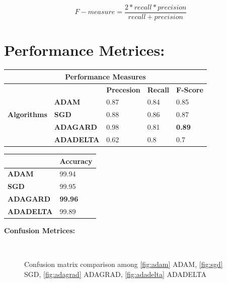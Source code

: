 \documentclass{report}
\begin{document}
\[F-measure = \frac{2 * recall * precision}{recall + precision}\]



\section{Performance Metrices: }
\begin{table}[htbp]
\begin{tabular}{|l|l|l|l|l|}
\hline
\multicolumn{5}{|c|}{\textbf{Performance Measures}} \\ \hline
\multirow{5}{*}{\textbf{Algorithms}} & \textbf{} & \textbf{Precesion} & \textbf{Recall} & \textbf{F-Score} \\ \cline{2-5} 
 & \textbf{ADAM} & 0.87 & 0.84 & 0.85 \\ \cline{2-5} 
 & \textbf{SGD} & 0.88 & 0.86 & 0.87 \\ \cline{2-5} 
 & \textbf{ADAGARD} & 0.98 & 0.81 & \textbf{0.89} \\ \cline{2-5} 
 & \textbf{ADADELTA} & 0.62 & 0.8 & 0.7 \\ \hline
\end{tabular}
\end{table}


\begin{table}[htbp]
\begin{tabular}{|l|l|}
\hline
 & \textbf{Accuracy} \\ \hline
\textbf{ADAM} & 99.94 \\ \hline
\textbf{SGD} & 99.95 \\ \hline
\textbf{ADAGARD} & \textbf{99.96} \\ \hline
\textbf{ADADELTA} & 99.89 \\ \hline
\end{tabular}
\end{table}

\textbf{Confusion Metrices: }

\begin{figure}[htbp]
\centering
    \\
  \label{fig:cm}
  \caption{Confusion matrix comparison among \ref{fig:adam} ADAM, \ref{fig:sgd} SGD, \ref{fig:adagrad} ADAGRAD, \ref{fig:adadelta} ADADELTA}
\end{figure}
\end{document}
